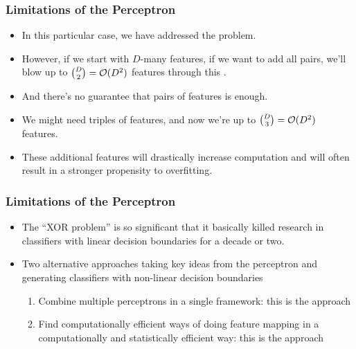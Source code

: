 \documentclass[trans]{beamer}
\begin{document}
\begin{frame}
  \frametitle{Limitations of the Perceptron}
\begin{itemize}
\item 
In this particular case, we have addressed the problem.  
\item However, if
we start with $D$-many features, if we want to add all pairs, we'll
blow up to ${D \choose 2} = \mathcal{O}(D^2)$ features through this
. 
\item  And there's no guarantee that pairs of
features is enough. 
\item We might need triples of features, and now we're
up to ${D \choose 3} = \mathcal{O}(D^2)$ features.  
\item These additional features
will drastically increase computation and will often result in a
stronger propensity to overfitting.
\end{itemize}
\end{frame}

\begin{frame}
  \frametitle{Limitations of the Perceptron}
\begin{itemize}
\item 
The ``XOR problem'' is so significant that it basically
killed research in classifiers with linear decision boundaries for a
decade or two.
\item Two alternative
approaches taking key ideas from the perceptron and generating
classifiers with non-linear decision boundaries
\begin{enumerate}
\item Combine multiple perceptrons in a single framework: this is the
 approach 
\item Find computationally efficient ways of doing
feature mapping in a computationally and statistically efficient way:
this is the  approach
\end{enumerate}
\end{itemize}
\end{frame}


\end{document}
